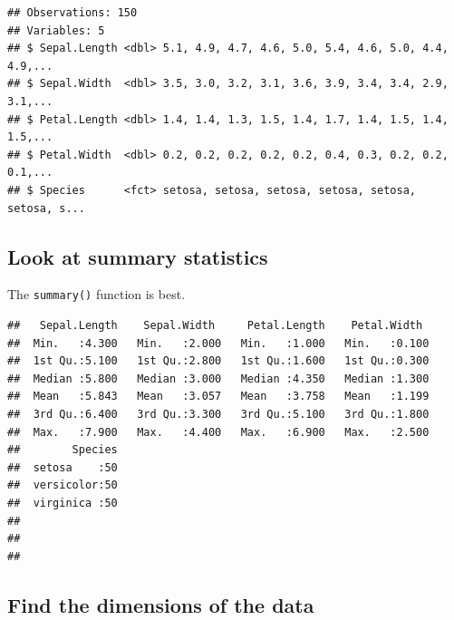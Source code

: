\documentclass[]{book}
\newenvironment{Shaded}{\begin{snugshade}}{\end{snugshade}}
\newcommand{\KeywordTok}[1]{\textcolor[rgb]{0.13,0.29,0.53}{\textbf{#1}}}
\newcommand{\NormalTok}[1]{#1}
\newcommand{\OperatorTok}[1]{\textcolor[rgb]{0.81,0.36,0.00}{\textbf{#1}}}
\newcommand{\StringTok}[1]{\textcolor[rgb]{0.31,0.60,0.02}{#1}}
\begin{document}
\begin{Shaded}
\end{Shaded}

\begin{verbatim}
## Observations: 150
## Variables: 5
## $ Sepal.Length <dbl> 5.1, 4.9, 4.7, 4.6, 5.0, 5.4, 4.6, 5.0, 4.4, 4.9,...
## $ Sepal.Width  <dbl> 3.5, 3.0, 3.2, 3.1, 3.6, 3.9, 3.4, 3.4, 2.9, 3.1,...
## $ Petal.Length <dbl> 1.4, 1.4, 1.3, 1.5, 1.4, 1.7, 1.4, 1.5, 1.4, 1.5,...
## $ Petal.Width  <dbl> 0.2, 0.2, 0.2, 0.2, 0.2, 0.4, 0.3, 0.2, 0.2, 0.1,...
## $ Species      <fct> setosa, setosa, setosa, setosa, setosa, setosa, s...
\end{verbatim}

\hypertarget{look-at-summary-statistics}{%
\subsection{Look at summary statistics}\label{look-at-summary-statistics}}

The \texttt{summary()} function is best.

\begin{Shaded}
\end{Shaded}

\begin{verbatim}
##   Sepal.Length    Sepal.Width     Petal.Length    Petal.Width   
##  Min.   :4.300   Min.   :2.000   Min.   :1.000   Min.   :0.100  
##  1st Qu.:5.100   1st Qu.:2.800   1st Qu.:1.600   1st Qu.:0.300  
##  Median :5.800   Median :3.000   Median :4.350   Median :1.300  
##  Mean   :5.843   Mean   :3.057   Mean   :3.758   Mean   :1.199  
##  3rd Qu.:6.400   3rd Qu.:3.300   3rd Qu.:5.100   3rd Qu.:1.800  
##  Max.   :7.900   Max.   :4.400   Max.   :6.900   Max.   :2.500  
##        Species  
##  setosa    :50  
##  versicolor:50  
##  virginica :50  
##                 
##                 
## 
\end{verbatim}

\hypertarget{find-the-dimensions-of-the-data}{%
\subsection{Find the dimensions of the data}\label{find-the-dimensions-of-the-data}}
\end{document}
